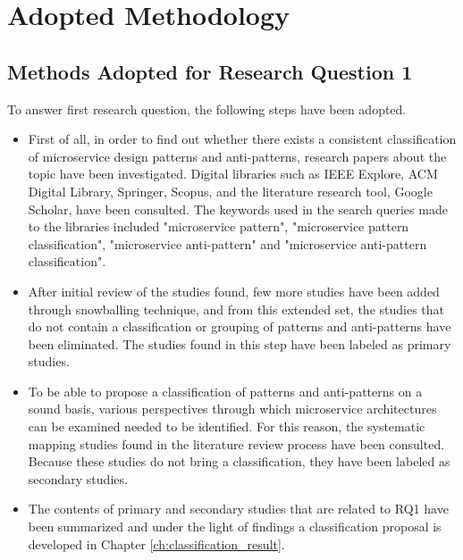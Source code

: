 \documentclass{Configuration_Files/PoliMi3i_thesis}
\begin{document}
\section{Adopted Methodology}
\label{sec:adopted_method}

\subsection{Methods Adopted for Research Question 1}
\label{subsec:adopted_method_RQ1}

To answer first research question, the following steps have been adopted.

\begin{itemize}
    \item First of all, in order to find out whether there exists a consistent classification of microservice design patterns and anti-patterns, research papers about the topic have been investigated.
    Digital libraries such as IEEE Explore, ACM Digital Library, Springer, Scopus, and the literature research tool, Google Scholar, have been consulted.
    The keywords used in the search queries made to the libraries included "microservice pattern", "microservice pattern classification", "microservice anti-pattern" and "microservice anti-pattern classification".

    \item After initial review of the studies found, few more studies have been added through snowballing technique, and from this extended set, the studies that do not contain a classification or grouping of patterns and anti-patterns have been eliminated.
    The studies found in this step have been labeled as primary studies.
    
    \item To be able to propose a classification of patterns and anti-patterns on a sound basis, various perspectives through which microservice architectures can be examined needed to be identified.
    For this reason, the systematic mapping studies found in the literature review process have been consulted.
    Because these studies do not bring a classification, they have been labeled as secondary studies.
    
    \item The contents of primary and secondary studies that are related to RQ1 have been summarized and under the light of findings a classification proposal is developed in Chapter \ref{ch:classification_result}.
\end{itemize}
\end{document}
